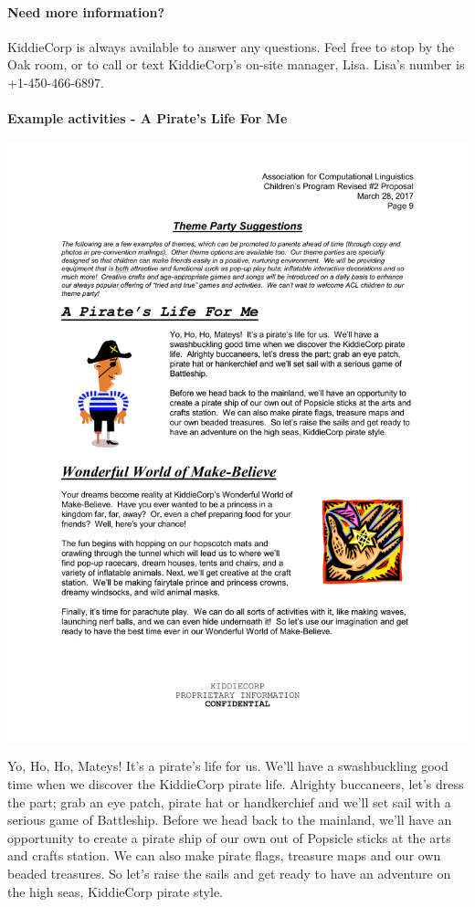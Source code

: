 \paragraph{Need more information?}
KiddieCorp is always available to answer any questions. Feel free to stop by the Oak room, or to call or text KiddieCorp's on-site manager, Lisa.  Lisa's number is +1-450-466-6897.

\paragraph{Example activities - A Pirate's Life For Me}

\includegraphics{content/local-guide/pirate.pdf}

Yo, Ho, Ho, Mateys! It's a pirate's life for us. We'll have a swashbuckling good time when we discover the KiddieCorp pirate life. Alrighty buccaneers, let's dress the part; grab an eye patch, pirate hat or handkerchief and we'll set sail with a serious game of Battleship.
Before we head back to the mainland, we'll have an opportunity to create a pirate ship of our own out of Popsicle sticks at the arts and crafts station. We can also make pirate flags, treasure maps and our own beaded treasures. So let's raise the sails and get ready to have an adventure on the high seas, KiddieCorp pirate style.
